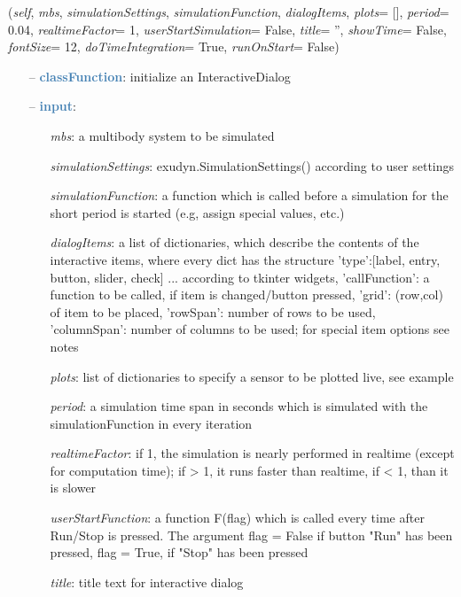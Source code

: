 \begin{itemize}[leftmargin=1.4cm]
\begin{itemize}[leftmargin=0.5cm]
\begin{itemize}[leftmargin=1.4cm]
\begin{itemize}[leftmargin=1.4cm]
\begin{itemize}[leftmargin=0.5cm]
\begin{itemize}[leftmargin=1.4cm]
\begin{itemize}[leftmargin=0.5cm]
\begin{itemize}[leftmargin=1.4cm]
\begin{itemize}[leftmargin=1.4cm]
\begin{flushleft}
({\it self}, {\it mbs}, {\it simulationSettings}, {\it simulationFunction}, {\it dialogItems}, {\it plots}= [], {\it period}= 0.04, {\it realtimeFactor}= 1, {\it userStartSimulation}= False, {\it title}= '', {\it showTime}= False, {\it fontSize}= 12, {\it doTimeIntegration}= True, {\it runOnStart}= False)
\end{flushleft}
\setlength{\itemindent}{0.7cm}
\begin{itemize}[leftmargin=0.7cm]
  \item[--]  \textcolor{steelblue}{\bf classFunction}: initialize an InteractiveDialog  \item[--]  \textcolor{steelblue}{\bf input}: \vspace{-6pt}
  \begin{itemize}[leftmargin=1.2cm]
\setlength{\itemindent}{-0.7cm}
    \item[] {\it mbs}: a multibody system to be simulated
    \item[] {\it   simulationSettings}: exudyn.SimulationSettings() according to user settings
    \item[] {\it   simulationFunction}: a function which is called before a simulation for the short period is started (e.g, assign special values, etc.)
    \item[] {\it   dialogItems}: a list of dictionaries, which describe the contents of the interactive items, where every dict has the structure {'type':[label, entry, button, slider, check] ... according to tkinter widgets, 'callFunction': a function to be called, if item is changed/button pressed, 'grid': (row,col) of item to be placed, 'rowSpan': number of rows to be used, 'columnSpan': number of columns to be used; for special item options see notes}
    \item[] {\it   plots}: list of dictionaries to specify a sensor to be plotted live, see example
    \item[] {\it   period}: a simulation time span in seconds which is simulated with the simulationFunction in every iteration
    \item[] {\it   realtimeFactor}: if 1, the simulation is nearly performed in realtime (except for computation time); if > 1, it runs faster than realtime, if < 1, than it is slower
    \item[] {\it   userStartFunction}: a function F(flag) which is called every time after Run/Stop is pressed. The argument flag = False if button "Run" has been pressed, flag = True, if "Stop" has been pressed
    \item[] {\it   title}: title text for interactive dialog

\end{itemize}
\end{itemize}
\end{itemize}
\end{itemize}
\end{itemize}
\end{itemize}
\end{itemize}
\end{itemize}
\end{itemize}
\end{itemize}
\end{itemize}

